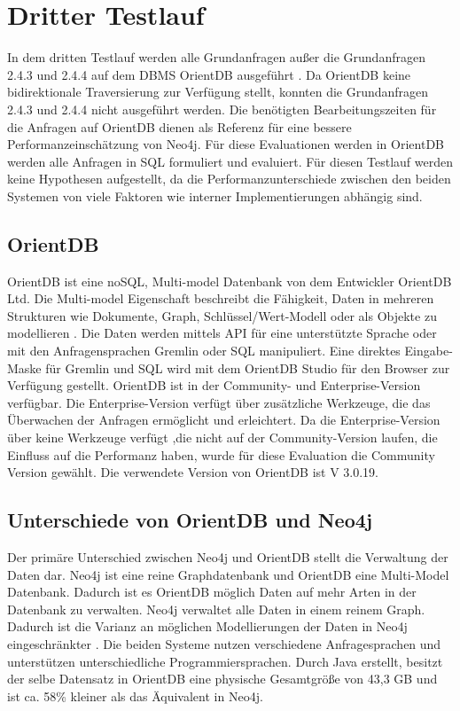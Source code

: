 \section{Dritter Testlauf}
In dem dritten Testlauf werden alle Grundanfragen außer die Grundanfragen 2.4.3 und 2.4.4 auf dem DBMS OrientDB ausgeführt \parencite{OrientDB}. Da OrientDB keine bidirektionale Traversierung zur Verfügung stellt, konnten die Grundanfragen 2.4.3 und 2.4.4 nicht ausgeführt werden. Die benötigten Bearbeitungszeiten für die Anfragen auf OrientDB dienen als Referenz für eine bessere Performanzeinschätzung von Neo4j. Für diese Evaluationen werden in OrientDB werden alle Anfragen in SQL formuliert und evaluiert. Für diesen Testlauf werden keine Hypothesen aufgestellt, da die Performanzunterschiede zwischen den beiden Systemen von viele Faktoren wie interner Implementierungen abhängig sind. 
\subsection{OrientDB}
OrientDB ist eine noSQL,  Multi-model Datenbank von dem Entwickler OrientDB Ltd. Die Multi-model Eigenschaft beschreibt die Fähigkeit, Daten in mehreren Strukturen wie Dokumente, Graph, Schlüssel/Wert-Modell oder als Objekte zu modellieren \parencite{OrientDB}. Die Daten werden mittels API für eine unterstützte Sprache oder mit den Anfragensprachen Gremlin oder SQL manipuliert. Eine direktes Eingabe-Maske für Gremlin und SQL wird mit dem OrientDB Studio für den Browser zur Verfügung gestellt. OrientDB ist in der Community- und Enterprise-Version verfügbar. Die Enterprise-Version verfügt über zusätzliche Werkzeuge, die das Überwachen der Anfragen ermöglicht und erleichtert. Da die Enterprise-Version über keine Werkzeuge verfügt ,die nicht auf der Community-Version laufen, die Einfluss auf die  Performanz haben, wurde für diese Evaluation die Community Version gewählt. Die verwendete Version von OrientDB ist V 3.0.19. 
\subsection{Unterschiede von OrientDB und Neo4j}
Der primäre Unterschied zwischen Neo4j und OrientDB stellt die Verwaltung der Daten dar. Neo4j ist eine reine Graphdatenbank und OrientDB eine Multi-Model Datenbank. Dadurch ist es OrientDB möglich Daten auf mehr Arten in der Datenbank zu verwalten. Neo4j verwaltet alle Daten in einem reinem Graph. Dadurch ist die Varianz an möglichen Modellierungen der Daten in Neo4j eingeschränkter \parencite{fernandes2018graph}. Die beiden Systeme nutzen verschiedene Anfragesprachen und unterstützen unterschiedliche Programmiersprachen. Durch Java erstellt, besitzt der selbe Datensatz in OrientDB eine physische Gesamtgröße von 43,3 GB und ist ca. 58\% kleiner als das Äquivalent in Neo4j.